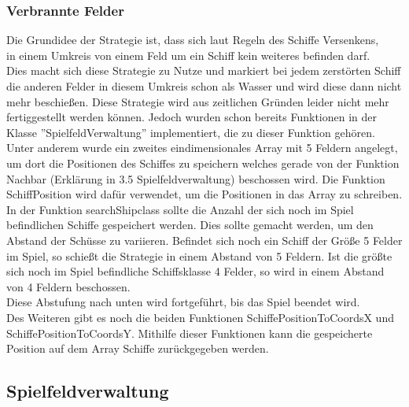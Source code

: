 \newpage

\subsubsection{Verbrannte Felder}

Die Grundidee der Strategie ist, dass sich laut Regeln des Schiffe Versenkens, \\in einem Umkreis von einem Feld um ein Schiff kein weiteres befinden 
darf. \\Dies macht sich diese Strategie zu Nutze und markiert bei jedem zerstörten Schiff die anderen Felder in diesem Umkreis schon als Wasser und wird diese dann 
nicht mehr beschießen. Diese Strategie wird aus zeitlichen Gründen leider nicht mehr fertiggestellt werden können. Jedoch wurden schon bereits Funktionen in der 
\\Klasse ''SpielfeldVerwaltung'' implementiert, die zu dieser Funktion gehören. \\Unter anderem wurde ein zweites eindimensionales Array mit 5 Feldern angelegt, \\um dort 
die Positionen des Schiffes zu speichern welches gerade von der Funktion \\Nachbar (Erklärung in 3.5 Spielfeldverwaltung) beschossen wird. Die Funktion SchiffPosition wird dafür verwendet, um die 
Positionen in das Array zu schreiben. \\In der Funktion searchShipclass sollte die Anzahl der sich noch im Spiel befindlichen Schiffe gespeichert werden. Dies 
sollte gemacht werden, um den Abstand der Schüsse zu variieren. Befindet sich noch ein Schiff der Größe 5 Felder im Spiel, so schießt die Strategie in einem 
Abstand von 5 Feldern. Ist die größte sich noch im Spiel befindliche Schiffsklasse 4 Felder, so wird in einem Abstand von 4 Feldern beschossen. \\Diese Abstufung nach 
unten wird fortgeführt, bis das Spiel beendet wird. \\Des Weiteren gibt es noch die beiden Funktionen SchiffePositionToCoordsX und SchiffePositionToCoordsY. Mithilfe dieser Funktionen kann die gespeicherte Position auf dem Array Schiffe zurückgegeben werden.

\subsection{Spielfeldverwaltung}

